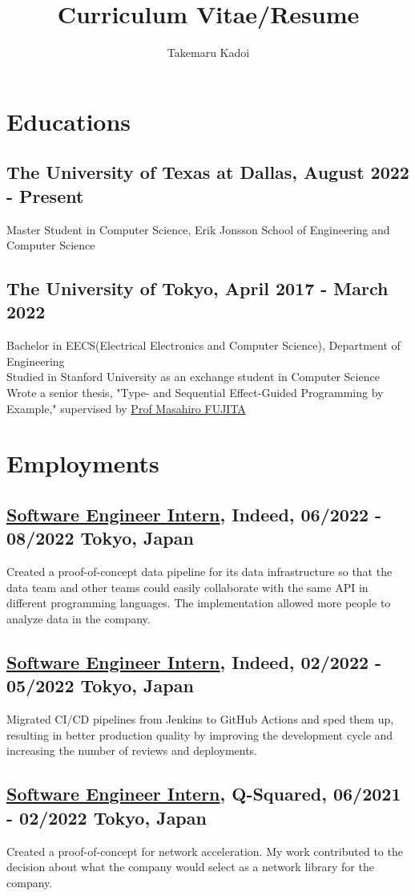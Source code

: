 \documentclass[10pt]{article}
\title{\vspace{-1cm}Curriculum Vitae/Resume}
\author{Takemaru Kadoi}
\date{}
\begin{document}
\section*{Educations}
  \subsection*{The University of Texas at Dallas, August 2022 - Present}
    Master Student in Computer Science, Erik Jonsson School of Engineering and Computer Science
  \subsection*{The University of Tokyo, April 2017 - March 2022}
    Bachelor in EECS(Electrical Electronics and Computer Science), Department of Engineering
    \\
    Studied in Stanford University as an exchange student in Computer Science
    \\
    Wrote a senior thesis, "Type- and Sequential Effect-Guided Programming by Example," supervised by \href{https://scholar.google.com/citations?user=tYabznkAAAAJ}{Prof Masahiro FUJITA}

\section*{Employments}
  \subsection*{\underline{Software Engineer Intern}, Indeed, 06/2022 - 08/2022 \hfill Tokyo, Japan}
    Created a proof-of-concept data pipeline for its data infrastructure so that the data team and other teams could easily collaborate with the same API in different programming languages.
    The implementation allowed more people to analyze data in the company.
  \subsection*{\underline{Software Engineer Intern}, Indeed, 02/2022 - 05/2022 \hfill Tokyo, Japan}
    Migrated CI/CD pipelines from Jenkins to GitHub Actions and sped them up, resulting in better production quality by improving the development cycle and increasing the number of reviews and deployments.
  \subsection*{\underline{Software Engineer Intern}, Q-Squared, 06/2021 - 02/2022 \hfill Tokyo, Japan}
    Created a proof-of-concept for network acceleration.
    My work contributed to the decision about what the company would select as a network library for the company.
\end{document}
